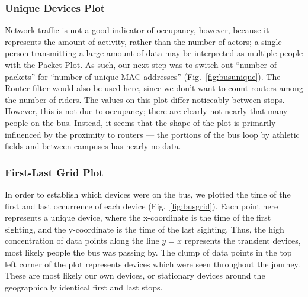 \subsubsection*{Unique Devices Plot}

Network traffic is not a good indicator of occupancy, however, because it represents the amount of activity, rather than the number of actors; a single person transmitting a large amount of data may be interpreted as multiple people with the Packet Plot.
As such, our next step was to switch out ``number of packets'' for ``number of unique MAC addresses'' (Fig.~\ref{fig:busunique}).
The Router filter would also be used here, since we don't want to count routers among the number of riders.
The values on this plot differ noticeably between stops.
However, this is not due to occupancy; there are clearly not nearly that many people on the bus.
Instead, it seems that the shape of the plot is primarily influenced by the proximity to routers --- the portions of the bus loop by athletic fields and between campuses has nearly no data.

\subsubsection*{First-Last Grid Plot}

In order to establish which devices were on the bus, we plotted the time of the first and last occurrence of each device (Fig.~\ref{fig:busgrid}).
Each point here represents a unique device, where the x-coordinate is the time of the first sighting, and the y-coordinate is the time of the last sighting.
Thus, the high concentration of data points along the line \(y=x\) represents the transient devices, most likely people the bus was passing by.
The clump of data points in the top left corner of the plot represents devices which were seen throughout the journey.
These are most likely our own devices, or stationary devices around the geographically identical first and last stops.

